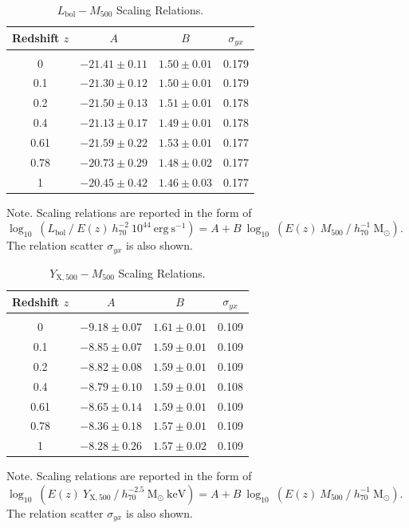 \documentclass[traditabstract]{aa}
\newcommand{\rmn}{\mathrm}
\begin{document}
\begin{table}[t]
\begin{center}
\caption{$L_{\rmn{bol}}-M_{500}$ Scaling Relations.}
\medskip
\begin{tabular}{cccc}
\hline
\phantom{\Big|}
Redshift $z$ & $A$ & $B$ & $\sigma_{yx}$ \\
\hline \\[-0.5em]
 0      & $-21.41\pm0.11$ & $1.50\pm0.01$ & 0.179\\
 0.1   & $-21.30\pm0.12$ & $1.50\pm0.01$ & 0.179\\
 0.2   & $-21.50\pm0.13$ & $1.51\pm0.01$ & 0.178\\ 
 0.4   & $-21.13\pm0.17$ & $1.49\pm0.01$ & 0.178\\ 
 0.61 & $-21.59\pm0.22$ & $1.53\pm0.01$ & 0.177\\ 
 0.78 & $-20.73\pm0.29$ & $1.48\pm0.02$ & 0.177\\ 
 1      & $-20.45\pm0.42$ & $1.46\pm0.03$ & 0.177\\[0.5em]
\hline
\end{tabular}
\label{tab:LMfits}
\end{center}
\footnotesize{Note. Scaling relations are reported in the form of $\log_{10}~(L_{\rmn{bol}}~/~E(z)~h_{70}^{-2}~10^{44}~\rmn{erg~s}^{-1})=A+B~\log_{10}~(E(z)~M_{500}~/~h_{70}^{-1}~\rmn{M_{\odot}})$. The relation scatter $\sigma_{yx}$ is also shown.}
\end{table}
 
\begin{table}[t]
\begin{center}
\caption{$Y_{\rmn{X}, 500}-M_{500}$ Scaling Relations.}
\medskip
\begin{tabular}{cccc}
\hline
\phantom{\Big|}
Redshift $z$ & $A$ & $B$ & $\sigma_{yx}$ \\
\hline\\[-0.5em]
 0      & $-9.18\pm0.07$ & $1.61\pm0.01$ & 0.109\\
 0.1   & $-8.85\pm0.07$ & $1.59\pm0.01$ & 0.109\\
 0.2   & $-8.82\pm0.08$ & $1.59\pm0.01$ & 0.109\\ 
 0.4   & $-8.79\pm0.10$ & $1.59\pm0.01$ & 0.108\\ 
 0.61 & $-8.65\pm0.14$ & $1.59\pm0.01$ & 0.109\\ 
 0.78 & $-8.36\pm0.18$ & $1.57\pm0.01$ & 0.109\\ 
 1      & $-8.28\pm0.26$ & $1.57\pm0.02$ & 0.109\\[0.5em]  
\hline
\end{tabular}
\label{tab:YXfits}
\end{center}
\footnotesize{Note. Scaling relations are reported in the form of $\log_{10}~(E(z)~Y_{\rmn{X},500}~/~h_{70}^{-2.5}~\rmn{M_{\odot}}~\rmn{keV})=A+B~\log_{10}~(E(z)~M_{500}~/~h_{70}^{-1}~\rmn{M_{\odot}})$. The relation scatter $\sigma_{yx}$ is also shown.}
\end{table}
\end{document}
